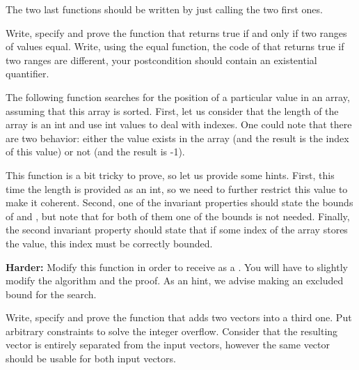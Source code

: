 The two last functions should be written by just calling the two first ones.




Write, specify and prove the function  that returns true if
and only if two ranges of values equal. Write, using the equal function, the
code of  that returns true if two ranges are different,
your postcondition should contain an existential quantifier.




\label{l4:statements-loops-ex-bsearch}

The following function searches for the position of a particular value in an
array, assuming that this array is sorted. First, let us consider that the
length of the array is an int and use int values to deal with indexes. One
could note that there are two behavior: either the value exists in the array
(and the result is the index of this value) or not (and the result is -1).




This function is a bit tricky to prove, so let us provide some hints. First,
this time the length is provided as an int, so we need to further restrict
this value to make it coherent. Second, one of the invariant properties
should state the bounds of  and , but note
that for both of them one of the bounds is not needed. Finally, the second
invariant property should state that if some index of the array stores the
value, this index must be correctly bounded.


\textbf{Harder:} Modify this function in order to receive 
as a . You will have to slightly modify the algorithm
and the proof. As an hint, we advise making  an excluded
bound for the search.




Write, specify and prove the function that adds two vectors into a third
one. Put arbitrary constraints to solve the integer overflow. Consider that
the resulting vector is entirely separated from the input vectors, however
the same vector should be usable for both input vectors.






